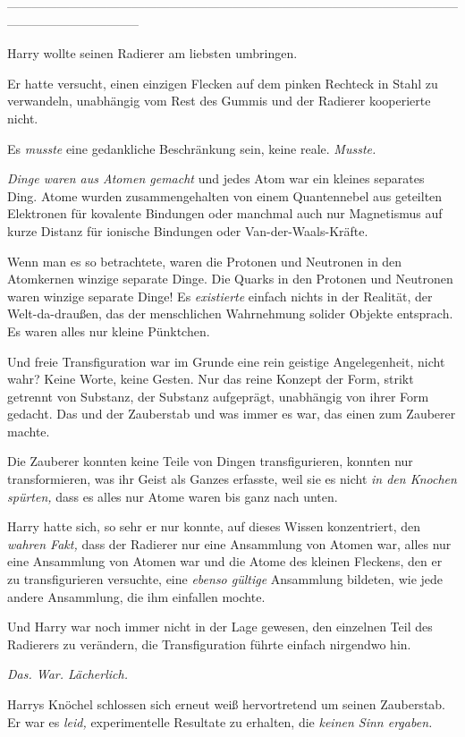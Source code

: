 {--------------------------------------------------------------------------------------------------------------------------------------------

Harry wollte seinen Radierer am liebsten umbringen.

Er hatte versucht, einen einzigen Flecken auf dem pinken Rechteck in Stahl zu verwandeln, unabhängig vom Rest des Gummis und der Radierer kooperierte nicht.

Es \emph{musste} eine gedankliche Beschränkung sein, keine reale. \emph{Musste.}

\emph{Dinge waren aus Atomen gemacht} und jedes Atom war ein kleines separates Ding. Atome wurden zusammengehalten von einem Quantennebel aus geteilten Elektronen für kovalente Bindungen oder manchmal auch nur Magnetismus auf kurze Distanz für ionische Bindungen oder Van-der-Waals-Kräfte.

Wenn man es so betrachtete, waren die Protonen und Neutronen in den Atomkernen winzige separate Dinge. Die Quarks in den Protonen und Neutronen waren winzige separate Dinge! Es \emph{existierte} einfach nichts in der Realität, der Welt-da-draußen, das der menschlichen Wahrnehmung solider Objekte entsprach. Es waren alles nur kleine Pünktchen.

Und freie Transfiguration war im Grunde eine rein geistige Angelegenheit, nicht wahr? Keine Worte, keine Gesten. Nur das reine Konzept der Form, strikt getrennt von Substanz, der Substanz aufgeprägt, unabhängig von ihrer Form gedacht. Das und der Zauberstab und was immer es war, das einen zum Zauberer machte.

Die Zauberer konnten keine Teile von Dingen transfigurieren, konnten nur transformieren, was ihr Geist als Ganzes erfasste, weil sie es nicht \emph{in den Knochen spürten,} dass es alles nur Atome waren bis ganz nach unten.

Harry hatte sich, so sehr er nur konnte, auf dieses Wissen konzentriert, den \emph{wahren Fakt,} dass der Radierer nur eine Ansammlung von Atomen war, alles nur eine Ansammlung von Atomen war und die Atome des kleinen Fleckens, den er zu transfigurieren versuchte, eine \emph{ebenso gültige} Ansammlung bildeten, wie jede andere Ansammlung, die ihm einfallen mochte.

Und Harry war noch immer nicht in der Lage gewesen, den einzelnen Teil des Radierers zu verändern, die Transfiguration führte einfach nirgendwo hin.

\emph{Das. War. Lächerlich.}

Harrys Knöchel schlossen sich erneut weiß hervortretend um seinen Zauberstab. Er war es \emph{leid,} experimentelle Resultate zu erhalten, die \emph{keinen Sinn ergaben.}

}
